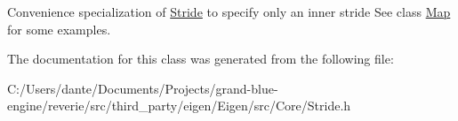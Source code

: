 Convenience specialization of \mbox{\hyperlink{class_eigen_1_1_stride}{Stride}} to specify only an inner stride See class \mbox{\hyperlink{class_eigen_1_1_map}{Map}} for some examples. 

The documentation for this class was generated from the following file\+:\begin{DoxyCompactItemize}
\item 
C\+:/\+Users/dante/\+Documents/\+Projects/grand-\/blue-\/engine/reverie/src/third\+\_\+party/eigen/\+Eigen/src/\+Core/Stride.\+h\end{DoxyCompactItemize}

